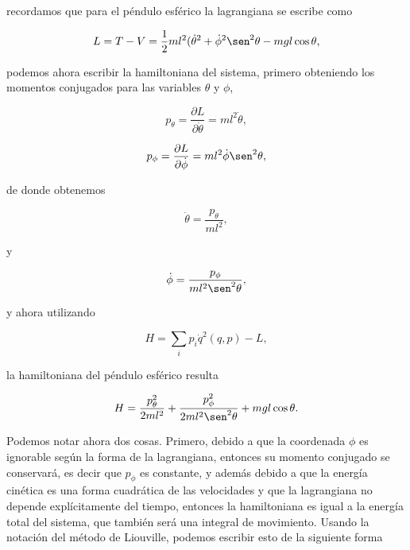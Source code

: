 \documentclass[a4paper,10pt]{article}
\numberwithin{equation}{section}
\begin{document}
recordamos que para el péndulo esférico la lagrangiana se escribe como 

\begin{equation}
 L = T - V = \frac{1}{2}ml^2(\dot{\theta}^2 + \dot{\phi}^2\sen^2{\theta} 
 - mgl\cos{\theta},
\end{equation}

podemos ahora escribir la hamiltoniana del sistema, primero obteniendo los momentos 
conjugados para las variables $\theta$ y $\phi$, 

\begin{equation}
 p_\theta = \frac{\partial L}{\partial \dot{\theta}} = ml^2\dot{\theta},
\end{equation}

\begin{equation}
 p_\phi = \frac{\partial L}{\partial \dot{\phi}} = ml^2\dot{\phi}\sen^2{\theta},
\end{equation}

de donde obtenemos 

\begin{equation}
 \dot{\theta} = \frac{p_\theta}{ml^2},
\end{equation}

y

\begin{equation}
 \dot{\phi} = \frac{p_\phi}{ml^2\sen^2{\theta}},
\end{equation}

y ahora utilizando 

\begin{equation}
 H = \sum_i p_i \dot{q}^2(q,p) - L, 
\end{equation}

la hamiltoniana del péndulo esférico resulta

\begin{equation}
 H = \frac{p_\theta^2}{2ml^2} + \frac{p_\phi^2}{2ml^2\sen^2{\theta}} 
 + mgl\cos{\theta}.
\end{equation}

Podemos notar ahora dos cosas. Primero, debido a que la coordenada $\phi$ es 
ignorable según la forma de la lagrangiana, entonces su momento conjugado se 
conservará, es decir que $p_\phi$ es constante, y además debido a que la energía 
cinética es una forma cuadrática de las velocidades y que la lagrangiana no depende 
explícitamente del tiempo, entonces la hamiltoniana es igual a la energía total 
del sistema, que también será una integral de movimiento. Usando la notación del
método de Liouville, podemos escribir esto de la siguiente forma 
\end{document}
